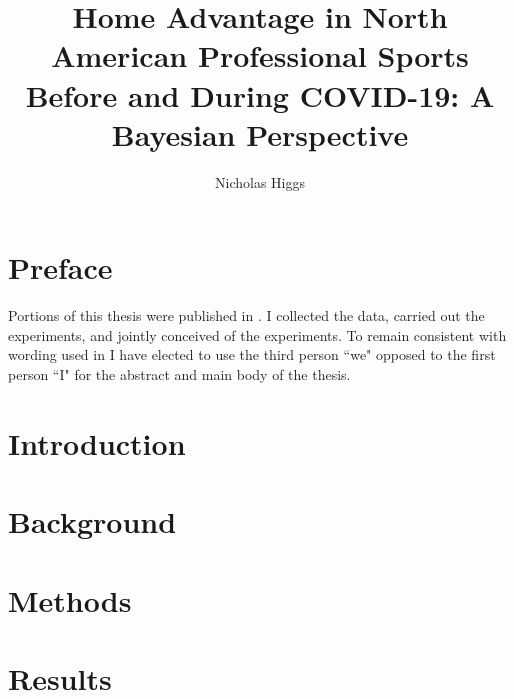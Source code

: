 \documentclass{uofsthesis-cs}
\title{Home Advantage in North American Professional Sports Before and During COVID-19: A Bayesian Perspective}
\author{Nicholas Higgs}
\begin{document}
\maketitle
{}

\frontmatter

\chapter*{Preface}
Portions of this thesis were published in \cite{Higgs2021}. I collected the data, carried out the experiments, and jointly conceived of the experiments. To remain consistent with wording used in \cite{Higgs2021} I have elected to use the third person ``we" opposed to the first person ``I" for the abstract and main body of the thesis.

\chapter{Introduction}



%
% 
% 
%


\chapter{Background}


\chapter{Methods}


\chapter{Results}

\end{document}
